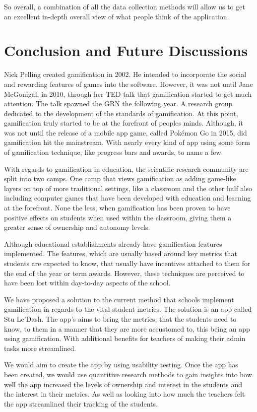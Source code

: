 \documentclass[sigchi]{acmart}
\begin{document}
So overall, a combination of all the data collection methods will allow us to get an excellent in-depth overall view of what people think of the application.

\section{Conclusion and Future Discussions}
Nick Pelling created gamification in 2002. He intended to incorporate the social and rewarding features of games into the software. However, it was not until Jane McGonigal, in 2010, through her TED talk that gamification started to get much attention. The talk spawned the GRN the following year. A research group dedicated to the development of the standards of gamification. At this point, gamification truly started to be at the forefront of peoples minds. Although, it was not until the release of a mobile app game, called Pokémon Go in 2015, did gamification hit the mainstream. With nearly every kind of app using some form of gamification technique, like progress bars and awards, to name a few.

With regards to gamification in education, the scientific research community are split into two camps.  One camp that views gamification as adding game-like layers on top of more traditional settings, like a classroom and the other half also including computer games that have been developed with education and learning at the forefront. None the less, when gamification has been proven to have positive effects on students when used within the classroom, giving them a greater sense of ownership and autonomy levels.

Although educational establishments already have gamification features implemented. The features, which are usually based around key metrics that students are expected to know, that usually have incentives attached to them for the end of the year or term awards. However, these techniques are perceived to have been lost within day-to-day aspects of the school. 

We have proposed a solution to the current method that schools implement gamification in regards to the vital student metrics. The solution is an app called Stu Le'Dash. The app's aims to bring the metrics, that the students need to know, to them in a manner that they are more accustomed to, this being an app using gamification. With additional benefits for teachers of making their admin tasks more streamlined.

We would aim to create the app by using usability testing. Once the app has been created, we would use quantitive research methods to gain insights into how well the app increased the levels of ownership and interest in the students and the interest in their metrics. As well as looking into how much the teachers felt the app streamlined their tracking of the students.
\end{document}
